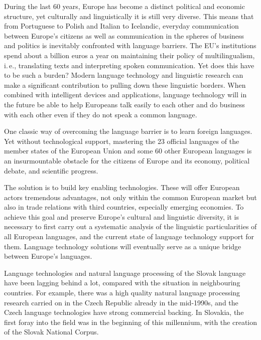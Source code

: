\begin{multicols}{2}

During the last 60 years, Europe has become a distinct political and economic
structure, yet culturally and linguistically it is still very diverse. This
means that from Portuguese to Polish and Italian to Icelandic, everyday
communication between Europe’s citizens as well as communication in the spheres
of business and politics is inevitably confronted with language barriers. The
EU’s institutions spend about a billion euros a year on maintaining their
policy of multilingualism, i.\,e., translating texts and interpreting spoken
communication. Yet does this have to be such a burden? Modern language
technology and linguistic research can make a significant contribution to
pulling down these linguistic borders. When combined with intelligent devices
and applications, language technology will in the future be able to help
Europeans talk easily to each other and do business with each other even if
they do not speak a common language. 


One classic way of overcoming the language barrier is to learn foreign
languages. Yet without technological support, mastering the 23 official
languages of the member states of the European Union and some 60 other European
languages is an insurmountable obstacle for the citizens of Europe and its
economy, political debate, and scientific progress.   

The solution is to build key enabling technologies. These will offer European
actors tremendous advantages, not only within the common European market but
also in trade relations with third countries, especially emerging economies. To
achieve this goal and preserve Europe’s cultural and linguistic diversity, it
is necessary to first carry out a systematic analysis of the linguistic
particularities of all European languages, and the current state of language
technology support for them. Language technology solutions will eventually
serve as a unique bridge between Europe’s languages. 


Language technologies and natural language processing of the Slovak language
have been lagging behind a lot, compared with the situation in neighbouring countries. For
example, there was a high quality natural language processing research carried
on in the Czech Republic already in the mid-1990s, and the Czech language
technologies have strong commercial backing. In Slovakia, the first foray into
the field was in the beginning of this millennium, with the creation of the
Slovak National Corpus.


\end{multicols}
